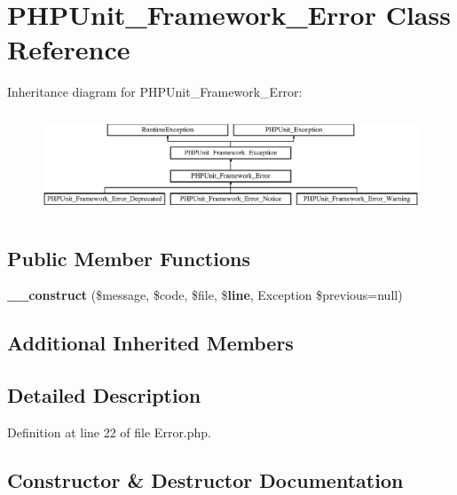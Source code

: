 \section{P\+H\+P\+Unit\+\_\+\+Framework\+\_\+\+Error Class Reference}
\label{class_p_h_p_unit___framework___error}
Inheritance diagram for P\+H\+P\+Unit\+\_\+\+Framework\+\_\+\+Error\+:\begin{figure}[H]
\begin{center}
\leavevmode
\includegraphics[height=3.035230cm]{class_p_h_p_unit___framework___error}
\end{center}
\end{figure}
\subsection*{Public Member Functions}
\begin{DoxyCompactItemize}
\item 
{\bf \+\_\+\+\_\+construct} (\$message, \$code, \$file, \${\bf line}, Exception \$previous=null)
\end{DoxyCompactItemize}
\subsection*{Additional Inherited Members}


\subsection{Detailed Description}


Definition at line 22 of file Error.\+php.



\subsection{Constructor \& Destructor Documentation}
